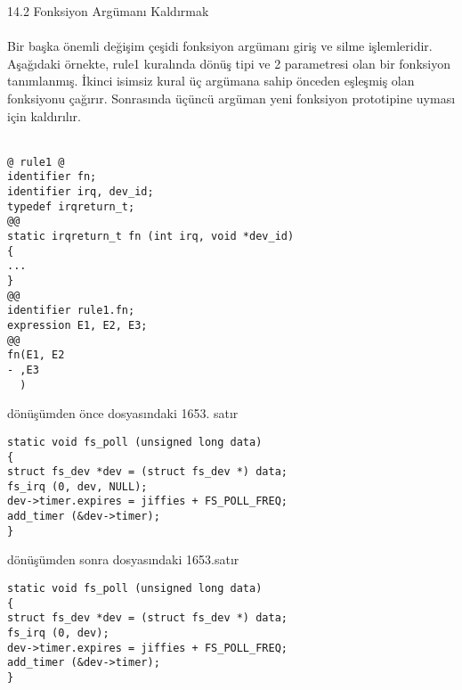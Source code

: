 \documentclass[22pt]{article}
\begin{document}
14.2 Fonksiyon Argümanı Kaldırmak\\
\\
Bir başka önemli değişim çeşidi fonksiyon argümanı giriş ve silme işlemleridir. Aşağıdaki örnekte, rule1 kuralında dönüş tipi ve 2 parametresi olan bir fonksiyon tanımlanmış. İkinci isimsiz kural üç argümana sahip önceden eşleşmiş olan fonksiyonu çağırır. Sonrasında üçüncü argüman yeni fonksiyon prototipine uyması için kaldırılır.\\
\\

\begin{lstlisting}
@ rule1 @
identifier fn;
identifier irq, dev_id;
typedef irqreturn_t;
@@
static irqreturn_t fn (int irq, void *dev_id)
{
...
}
@@
identifier rule1.fn;
expression E1, E2, E3;
@@
fn(E1, E2
- ,E3
  )
\end{lstlisting}
dönüşümden önce  dosyasındaki 1653. satır\\
\begin{lstlisting}
static void fs_poll (unsigned long data)
{
struct fs_dev *dev = (struct fs_dev *) data;
fs_irq (0, dev, NULL);
dev->timer.expires = jiffies + FS_POLL_FREQ;
add_timer (&dev->timer);
}
\end{lstlisting}
dönüşümden sonra  dosyasındaki 1653.satır\\
\begin{lstlisting}
static void fs_poll (unsigned long data)
{
struct fs_dev *dev = (struct fs_dev *) data;
fs_irq (0, dev);
dev->timer.expires = jiffies + FS_POLL_FREQ;
add_timer (&dev->timer);
}
\end{lstlisting}
\end{document}
